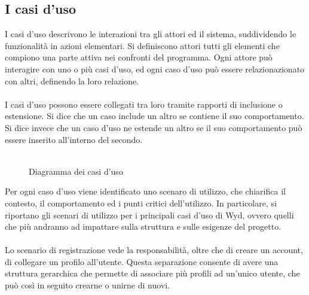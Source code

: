 \clearpage


\subsection{I casi d’uso}

I casi d’uso descrivono le interazioni tra gli attori ed il sistema, suddividendo le funzionalità in azioni elementari.
Si definiscono attori tutti gli elementi che compiono una parte attiva nei confronti del programma.
Ogni attore può interagire con uno o più casi d'uso, 
ed ogni caso d'uso può essere relazionazionato con altri, definendo la loro relazione.\\
\\
I casi d'uso possono essere collegati tra loro tramite rapporti di inclusione o estensione.
Si dice che un caso include un altro se contiene il suo comportamento.
Si dice invece che un caso d'uso ne estende un altro se il suo comportamento può essere inserito all'interno del secondo.\\
\\

\begin{figure}[htb]
    \centering
    \caption{Diagramma dei casi d'uso}
\end{figure}
\clearpage
Per ogni caso d'uso viene identificato uno scenaro di utilizzo, che chiarifica il contesto, il comportamento ed i punti critici dell'utilizzo.
In particolare, si riportano gli scenari di utilizzo per i principali casi d'uso di Wyd, ovvero quelli
che più andranno ad impattare sulla struttura e sulle esigenze del progetto.\\
\\
Lo scenario di registrazione vede la responsabilità, oltre che di creare un account, di collegare un profilo all'utente.
Questa separazione consente di avere una struttura gerarchica che permette di associare più profili ad un'unico utente, che può così in seguito crearne o unirne di nuovi.\\

